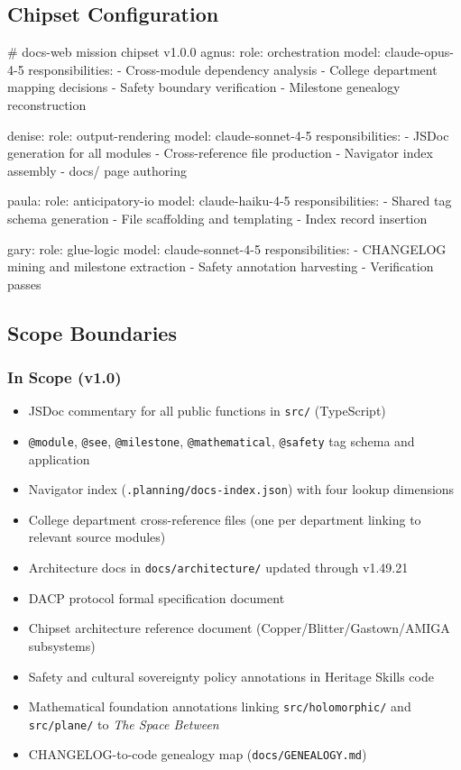 \documentclass[11pt,letterpaper]{article}
\begin{document}
\subsection{Chipset Configuration}

\begin{asciibox}
\# docs-web mission chipset v1.0.0
agnus:
  role: orchestration
  model: claude-opus-4-5
  responsibilities:
    - Cross-module dependency analysis
    - College department mapping decisions
    - Safety boundary verification
    - Milestone genealogy reconstruction

denise:
  role: output-rendering
  model: claude-sonnet-4-5
  responsibilities:
    - JSDoc generation for all modules
    - Cross-reference file production
    - Navigator index assembly
    - docs/ page authoring

paula:
  role: anticipatory-io
  model: claude-haiku-4-5
  responsibilities:
    - Shared tag schema generation
    - File scaffolding and templating
    - Index record insertion

gary:
  role: glue-logic
  model: claude-sonnet-4-5
  responsibilities:
    - CHANGELOG mining and milestone extraction
    - Safety annotation harvesting
    - Verification passes
\end{asciibox}

\subsection{Scope Boundaries}

\subsubsection{In Scope (v1.0)}

\begin{itemize}[noitemsep]
  \item JSDoc commentary for all public functions in \texttt{src/} (TypeScript)
  \item \texttt{@module}, \texttt{@see}, \texttt{@milestone}, \texttt{@mathematical}, \texttt{@safety} tag schema and application
  \item Navigator index (\texttt{.planning/docs-index.json}) with four lookup dimensions
  \item College department cross-reference files (one per department linking to relevant source modules)
  \item Architecture docs in \texttt{docs/architecture/} updated through v1.49.21
  \item DACP protocol formal specification document
  \item Chipset architecture reference document (Copper/Blitter/Gastown/AMIGA subsystems)
  \item Safety and cultural sovereignty policy annotations in Heritage Skills code
  \item Mathematical foundation annotations linking \texttt{src/holomorphic/} and \texttt{src/plane/} to \textit{The Space Between}
  \item CHANGELOG-to-code genealogy map (\texttt{docs/GENEALOGY.md})
\end{itemize}
\end{document}
